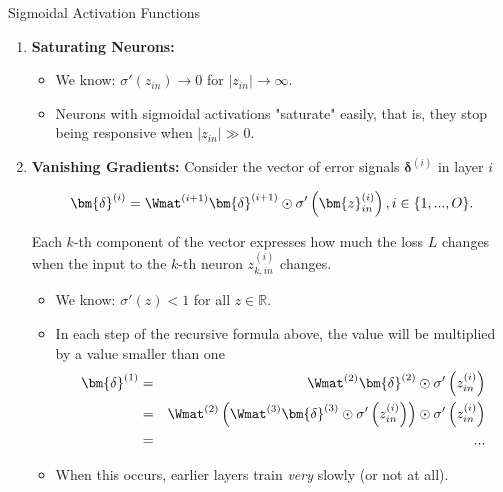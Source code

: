 \documentclass[11pt,compress,t,notes=noshow, xcolor=table]{beamer}
\begin{document}
\begin{vbframe}{Sigmoidal Activation Functions}

\begin{enumerate}
  \item \textbf{Saturating Neurons:}
  \begin{itemize}
    \item We know: $\sigma'\left(z_{in}\right) \to 0$ for $|z_{in}| \to \infty$. 
    \item[$\to$] Neurons with sigmoidal activations "saturate" easily, that is, they stop being responsive when $|z_{in}| \gg 0$. 
  \end{itemize}

  \framebreak 

  \item \textbf{Vanishing Gradients: } Consider the vector of error signals $\bm{\delta}^{(i)}$ in layer $i$ 

    $$
      \bm{\delta}^{(i)} = \Wmat^{(i + 1)} \bm{\delta}^{(i + 1)} \odot \sigma'\left(\bm{z}_{in}^{(i)}\right), i \in\{ 1, ..., O\}. 
    $$

    Each $k$-th component of the vector expresses how much the loss $L$ changes when the input to the $k$-th neuron $z_{k, in}^{(i)}$ changes. 
    \begin{itemize}
      \item We know: $\sigma'(z)< 1$ for all $z \in \mathbb{R}$. 
      \item[$\to$] In each step of the recursive formula above, the value will be multiplied by a value smaller than one
      \begin{eqnarray*}
        \bm{\delta}^{(1)} &=& \Wmat^{(2)} \bm{\delta}^{(2)} \odot \sigma'\left(z_{in}^{(i)}\right) \\
        &=& \Wmat^{(2)} \left(\Wmat^{(3)} \bm{\delta}^{(3)} \odot \sigma'\left(z_{in}^{(i)}\right)\right) \odot \sigma'\left(z_{in}^{(i)}\right) \\
        &=& ...
      \end{eqnarray*}
      \item When this occurs, earlier layers train \emph{very} slowly (or not at all).
    \end{itemize}
\end{enumerate}

\end{vbframe}
\end{document}
